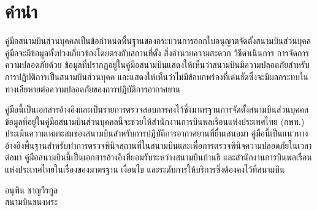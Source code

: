 
\chapter*{คำนำ}


คู่มือสนามบินส่วนบุคคลเป็นข้อกำหนดพื้นฐานของกระบวนการออกใบอนุญาตจัดตั้งสนามบินส่วนบุคล คู่มือจะมีข้อมูลทั้งปวงเกี่ยวข้องโดยตรงกับสถานที่ตั้ง สิ่งอำนวยความสะดวก วิธีดำเนินการ การจัดการความปลอดภัยด้วย ข้อมูลที่ปรากฏอยู่ในคู่มือสนามบินแสดงให้เห็นว่าสนามบินมีความปลอดภัยสำหรับการปฏิบัติการเป็นสนามบินส่วนบุคค  และแสดงให้เห็นว่าไม่มีข้อบกพร่องที่เด่นชัดซึ่งจะมีผลกระทบในทางเสียหายต่อความปลอดภัยของการปฏิบัติการอากาศยาน 

คู่มือนี้เป็นเอกสารอ้างอิงและเป็นรายการตรวจสอบการคงไว้ซึ่งมาตรฐานการจัดตั้งสนามบินส่วนบุคคล ข้อมูลที่อยู่ในคู่มือสนามบินส่วนบุคคลนี้จะช่วยให้สำนักงานการบินพลเรือนแห่งประเทศไทย (กพท.) ประเมินความเหมาะสมของสนามบินสำหรับการปฏิบัติการอากาศยานที่ยื่นเสนอมา คู่มือนี้เป็นแนวทางอ้างอิงพื้นฐานสำหรับทำการตรวจพินิจสถานที่ในสนามบินและเพื่อการตรวจพินิจความปลอดภัยในเวลาต่อมา คู่มือสนามบินนี้เป็นเอกสารอ้างอิงที่ยอมรับระหว่างสนามบินบ้านธิ และสำนักงานการบินพลเรือนแห่งประเทศไทยในเรื่องของมาตรฐาน เงื่อนไข และระดับการให้บริการซึ่งต้องคงไว้ที่สนามบิน \\
\vskip 10pt


อนุทิน ชาญวีรกูล \\
สนามบินขนงพระ \\
\date{สิงหาคม 2561} \\
